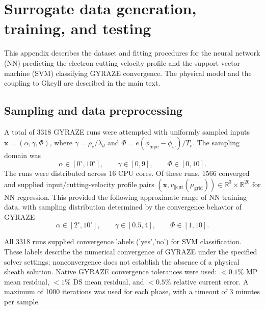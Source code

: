 \documentclass[aps,prl,reprint]{revtex4-2}
\begin{document}

\section{Surrogate data generation, training, and testing}
\label{app:surrogate_training}

This appendix describes the dataset and fitting procedures for the neural
network (NN) predicting the electron cutting-velocity profile and the support
vector machine (SVM) classifying GYRAZE convergence. The physical model and
the coupling to Gkeyll are described in the main text.

\subsection{Sampling and data preprocessing}

A total of 3318 GYRAZE runs were attempted with uniformly sampled inputs
$\mathbf{x}=(\alpha,\gamma,\Phi)$, where
$\gamma=\rho_e/\lambda_d$ and
$\Phi=e(\phi_{\mathrm{mpe}}-\phi_w)/T_e$. The sampling domain was
\begin{equation}
  \alpha\in[0^\circ,10^\circ],\qquad
  \gamma\in[0,9],\qquad
  \Phi\in[0,10].
\end{equation}
The runs were distributed across 16 CPU cores. Of these runs, 1566 converged
and supplied input/cutting-velocity profile pairs $(\mathbf{x}, v_{\parallel \text{cut}}(\mu_{\text{grid}}))\in \mathbb{R}^3 \times \mathbb{R}^{20}$ for NN regression. This provided the following approximate range of NN training data, with sampling distribution determined by the convergence behavior of GYRAZE
\begin{equation}
  \alpha\in[2^\circ,10^\circ],\qquad
  \gamma\in[0.5,4],\qquad
  \Phi\in[1,10].
\end{equation}

All 3318 runs
supplied convergence labels ('yes','no') for SVM classification. These labels describe
the numerical convergence of GYRAZE under the specified solver settings;
nonconvergence does not establish the absence of a physical sheath solution. Native GYRAZE convergence tolerances were used: $<0.1\%$ MP mean residual, $<1\%$ DS mean residual, and $<0.5\%$ relative current error. A maximum of 1000 iterations was used for each phase, with a timeout of 3 minutes per sample.
\end{document}

